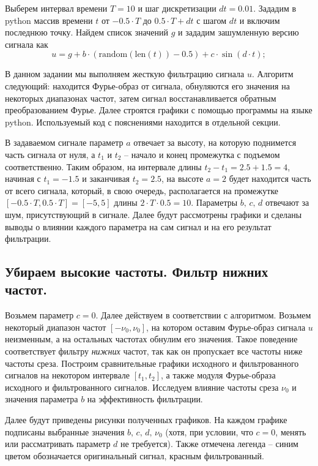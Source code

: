 \documentclass[a4paper, 12pt]{article}
\begin{document}
    Выберем интервал времени $T=10$ и шаг дискретизации $dt=0.01$. Зададим в python массив времени $t$ от $-0.5\cdot T$ до $0.5\cdot T+dt$
    с шагом $dt$ и включим последнюю точку. Найдем список значений $g$ и зададим зашумленную версию сигнала как
    $$
    u=g+b\cdot(\text{random}(\text{len}(t))-0.5) + c\cdot \sin(d\cdot t);
    $$


    В данном задании мы выполняем жесткую фильтрацию сигнала $u$. Алгоритм следующий: находится Фурье-образ от сигнала,
    обнуляются его значения на некоторых диапазонах частот, затем сигнал восстанавливается обратным преобразованием Фурье.
    Далее строятся графики с помощью программы на языке python. Используемый код с пояснениями находится в отдельной секции.


    В задаваемом сигнале параметр $a$ отвечает за высоту, на которую поднимется часть сигнала от нуля, а $t_1 \text{ и } t_2$ -- начало
    и конец промежутка с подъемом соответственно. Таким образом, на интервале длины $t_2-t_1=2.5+1.5=4$, начиная с $t_1=-1.5$ и заканчивая $t_2=2.5$,
    на высоте $a=2$ будет находится часть от всего сигнала, который, в свою очередь, располагается на промежутке $[-0.5\cdot T,0.5\cdot T]=[-5,5]$
    длины $2\cdot T\cdot 0.5=10$. Параметры $b,\,c,\,d$ отвечают за шум, присутствующий в сигнале. Далее будут рассмотрены графики и сделаны выводы о
    влиянии каждого параметра на сам сигнал и на его результат фильтрации.


    \subsection{Убираем высокие частоты. Фильтр нижних частот.}
    Возьмем параметр $c=0$. Далее действуем в соответствии с алгоритмом. Возьмем некоторый диапазон частот $[-\nu_0, \nu_0]$, на котором оставим Фурье-образ
    сигнала $u$ неизменным, а на остальных частотах обнулим его значения. Такое поведение соответствует фильтру \textit{нижних} частот, так как он пропускает
    все частоты ниже частоты среза. Построим сравнительные графики исходного и фильтрованного сигналов на некотором интервале $[t_1,t_2]$, а также модуля
    Фурье-образа исходного и фильтрованного сигналов. Исследуем влияние частоты среза $\nu_0$ и значения параметра $b$ на эффективность фильтрации.
    
    
    Далее будут приведены рисунки полученных графиков. На каждом графике подписаны выбранные значения $b,\,c,\,d,\,\nu_0$
    (хотя, при условии, что $c=0$, менять или рассматривать параметр $d$ не требуется). Также отмечена легенда -- синим цветом
    обозначается оригинальный сигнал, красным фильтрованный.
\end{document}
